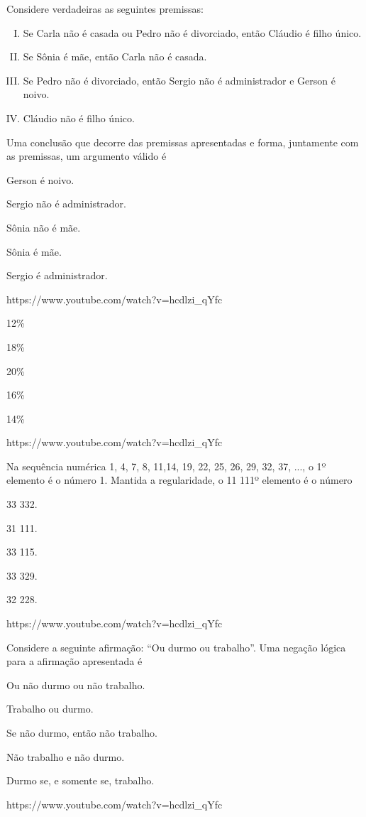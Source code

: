 \questao{}
{Considere verdadeiras as seguintes premissas:
\begin{enumerate}[I.]
\item Se Carla não é casada ou Pedro não é divorciado, então Cláudio é filho único.
\item Se Sônia é mãe, então Carla não é casada.
\item Se Pedro não é divorciado, então Sergio não é administrador e Gerson é noivo.
\item Cláudio não é filho único.
\end{enumerate}
Uma conclusão que decorre das premissas apresentadas e forma, juntamente com as premissas, um argumento
válido é}
{
\item Gerson é noivo.
\item Sergio não é administrador.
\item Sônia não é mãe.
\item Sônia é mãe.
\item Sergio é administrador.}
{https://www.youtube.com/watch?v=hcdlzi_qYfc}

{
\item 12\%
\item 18\%
\item 20\%
\item 16\%
\item 14\%}
{https://www.youtube.com/watch?v=hcdlzi_qYfc}

\questao{}
{Na sequência numérica 1, 4, 7, 8, 11,14, 19, 22, 25, 26, 29, 32, 37, ..., o 1º elemento é o número 1. Mantida a regularidade, o 11 111º elemento é o número}
{
\item 33 332.
\item 31 111.
\item 33 115.
\item 33 329.
\item 32 228.}
{https://www.youtube.com/watch?v=hcdlzi_qYfc}

\questao{}
{Considere a seguinte afirmação: “Ou durmo ou trabalho”. Uma negação lógica para a afirmação apresentada é}
{
\item Ou não durmo ou não trabalho.
\item Trabalho ou durmo.
\item Se não durmo, então não trabalho.
\item Não trabalho e não durmo.
\item Durmo se, e somente se, trabalho.}
{https://www.youtube.com/watch?v=hcdlzi_qYfc}

